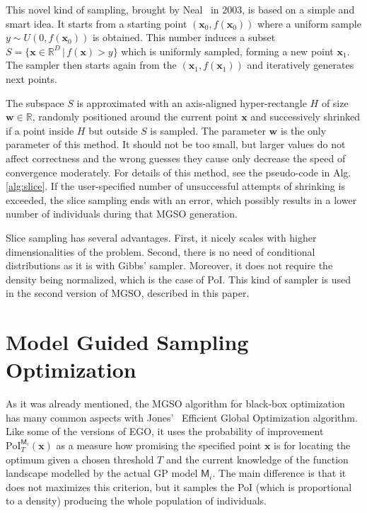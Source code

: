 \documentclass{itatnew}
\newcommand{\xx}{\mathrm{\mathbf{x}}}
\begin{document}
This novel kind of sampling, brought by Neal~\cite{neal_slice_2003} in 2003, is based on a simple and smart idea. It starts from a starting point $(\xx_0, f(\xx_0))$ where a uniform sample $y \sim U(0,f(\xx_0))$ is obtained. This number induces a subset $S=\{\xx \in \mathbb{R}^D \,|\, f(\xx) > y\}$ which is
uniformly sampled, forming a new point $\xx_1$. The sampler then starts again from the $(\xx_1, f(\xx_1))$ and iteratively generates next points.

The subspace $S$ is approximated with an axis-aligned hyper-rectangle $H$ of size $\mathbf{w} \in \mathbb{R}$, randomly positioned around the current point $\xx$ and successively shrinked if a point inside $H$ but outside $S$ is sampled. The parameter $\mathbf{w}$ is the only parameter of this method. It should not be too small, but larger values do not affect correctness and the wrong guesses they cause only decrease the speed of convergence moderately. For details of this method, see the pseudo-code in Alg.\,\ref{alg:slice}. If the user-specified number of unsuccessful attempts of shrinking is exceeded, the slice sampling ends with an error, which possibly results in a lower number of individuals during that MGSO generation.

Slice sampling has several advantages. First, it nicely scales with higher dimensionalities of the problem. Second, there is no need of conditional distributions as it is with Gibbs' sampler. Moreover, it does not require the density being normalized, which is the case of PoI. This kind of sampler is used in the second version of MGSO, described in this paper.


\section{Model Guided Sampling Optimization}
\label{sec:mgso}

As it was already mentioned, the MGSO algorithm for black-box optimization has many common aspects with Jones'~\cite{jones_efficient_1998} Efficient Global Optimization algorithm. Like some of the versions of EGO, it uses the probability of improvement $\mathrm{PoI}_T^{\mathsf{M}_i}(\xx)$ as a measure how promising the specified point $\xx$ is for locating the optimum given a chosen threshold $T$ and the current knowledge of the function landscape
modelled by the actual GP model $\mathsf{M}_i$. The main difference is that it does not maximizes this criterion, but it samples the PoI (which is proportional to a density) producing the whole population of individuals. 
\end{document}
